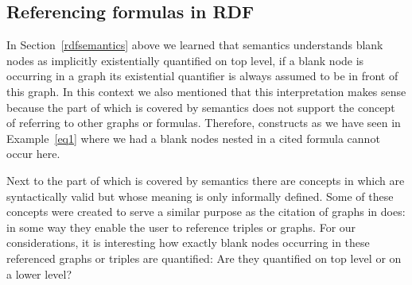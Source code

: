 \subsection{Referencing formulas in RDF}
In Section~\ref{rdfsemantics} above  we learned that \rdf semantics understands blank nodes as implicitly existentially quantified on top level, \ie if a blank node is occurring in a graph 
its existential quantifier is always assumed to be in front of this graph. In this context we also mentioned that this interpretation makes sense 
because the part of \rdf which is covered
by \rdf semantics does not support the concept of referring to other graphs or formulas. Therefore, constructs as we have seen in Example~\ref{eq1} where we had a blank nodes nested in a
cited formula cannot occur here. 

Next to the  part of \rdf which is covered by \rdf semantics there are concepts in \rdf which are syntactically valid but whose meaning is only informally defined. Some of these 
concepts were created to serve a similar purpose as the citation of graphs in \nthree does: in some way they enable the user to reference triples or graphs. 
For our considerations, it is interesting how exactly blank nodes occurring in these referenced graphs or triples are quantified:
Are they quantified on top level or on a lower level? 

